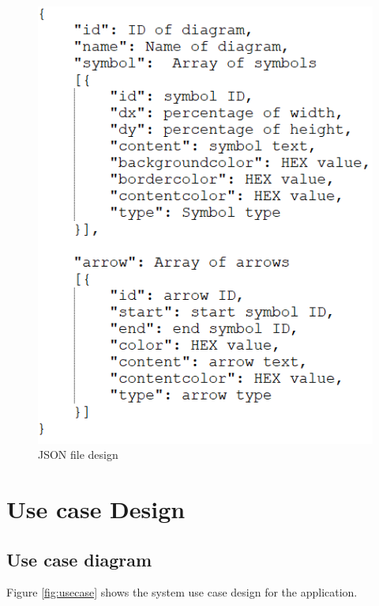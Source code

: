 \begin{figure}[!b]
\centering
\includegraphics[width=12cm]{Images/App/jsonFile.png}
\caption{JSON file design}
\label{fig:jsonfile}
\end{figure}



\section{Use case Design}
\subsection{Use case diagram}
Figure \ref{fig:usecase} shows the system use case design for the application.


